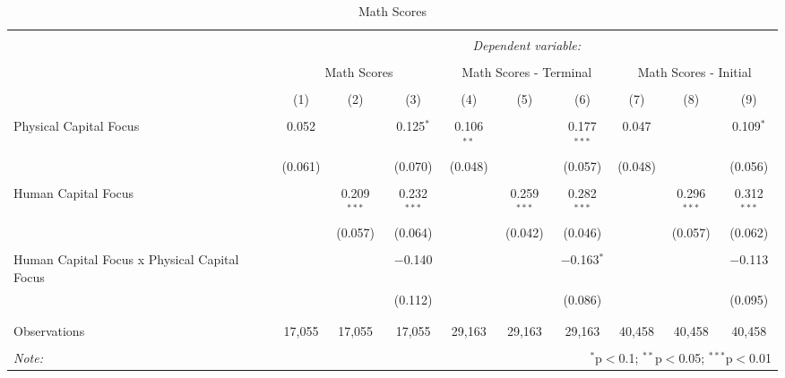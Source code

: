
\begin{table}[!htbp] \centering 
  \caption{Math Scores} 
  \label{} 
\begin{tabular}{@{\extracolsep{5pt}}lccccccccc} 
\\[-1.8ex]\hline 
\hline \\[-1.8ex] 
 & \multicolumn{9}{c}{\textit{Dependent variable:}} \\ 
\cline{2-10} 
\\[-1.8ex] & \multicolumn{3}{c}{Math Scores} & \multicolumn{3}{c}{Math Scores - Terminal} & \multicolumn{3}{c}{Math Scores - Initial} \\ 
\\[-1.8ex] & (1) & (2) & (3) & (4) & (5) & (6) & (7) & (8) & (9)\\ 
\hline \\[-1.8ex] 
 Physical Capital Focus & 0.052 &  & 0.125$^{*}$ & 0.106$^{**}$ &  & 0.177$^{***}$ & 0.047 &  & 0.109$^{*}$ \\ 
  & (0.061) &  & (0.070) & (0.048) &  & (0.057) & (0.048) &  & (0.056) \\ 
  & & & & & & & & & \\ 
 Human Capital Focus &  & 0.209$^{***}$ & 0.232$^{***}$ &  & 0.259$^{***}$ & 0.282$^{***}$ &  & 0.296$^{***}$ & 0.312$^{***}$ \\ 
  &  & (0.057) & (0.064) &  & (0.042) & (0.046) &  & (0.057) & (0.062) \\ 
  & & & & & & & & & \\ 
 Human Capital Focus x Physical Capital Focus &  &  & $-$0.140 &  &  & $-$0.163$^{*}$ &  &  & $-$0.113 \\ 
  &  &  & (0.112) &  &  & (0.086) &  &  & (0.095) \\ 
  & & & & & & & & & \\ 
\hline \\[-1.8ex] 
Observations & 17,055 & 17,055 & 17,055 & 29,163 & 29,163 & 29,163 & 40,458 & 40,458 & 40,458 \\ 
\hline 
\hline \\[-1.8ex] 
\textit{Note:}  & \multicolumn{9}{r}{$^{*}$p$<$0.1; $^{**}$p$<$0.05; $^{***}$p$<$0.01} \\ 
\end{tabular} 
\end{table} 
